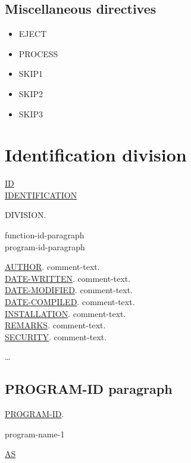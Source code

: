 \documentclass[a4paper,oneside,svgnames]{scrbook}
\makeatletter
\newcommand{\key}[1]{\underline{#1}}
\newcommand{\deleted}[1]{%
  \colorbox{red!75}{#1}}
\newcommand{\gnucobol}[1]{%
  \colorbox{orange!75}{#1}}
\newcommand{\miscext}[1]{%
  \colorbox{blue!50}{#1}}
\newcommand{\pending}[1]{%
  \textcolor{gray!75}{#1}}
\newenvironment{0-1}{$\left[ \begin{tabular}{@{}l@{}}}{\end{tabular} \right]$}
\newenvironment{0+}{$\left[\left| \begin{tabular}{@{}l@{}}}{\end{tabular} \right|\right]$}
\newenvironment{1=}{$\left\{ \begin{tabular}{@{}l@{}}}{\end{tabular} \right\}$}
\makeatother
\begin{document}
\section{Miscellaneous directives}

\begin{itemize}
\item \miscext{EJECT}
\item \miscext{\pending{PROCESS}}
\item \miscext{SKIP1}
\item \miscext{SKIP2}
\item \miscext{SKIP3}
\end{itemize}
\chapter{Identification division}

\begin{0-1}
  \begin{1=}
    \miscext{\key{ID}} \\
    \key{IDENTIFICATION}
  \end{1=}
  DIVISION.
\end{0-1}
\newline
\begin{1=}
  function-id-paragraph \\
  program-id-paragraph
\end{1=}
\newline
\deleted{
  \begin{0+}
    \key{AUTHOR}. comment-text. \\
    \key{DATE-WRITTEN}. comment-text. \\
    \key{DATE-MODIFIED}. comment-text. \\
    \key{DATE-COMPILED}. comment-text. \\
    \key{INSTALLATION}. comment-text. \\
    \key{REMARKS}. comment-text. \\
    \key{SECURITY}. comment-text. \\
  \end{0+} \gnucobol{\ldots}
}

\section{PROGRAM-ID paragraph}

\key{PROGRAM-ID}.
\begin{1=}
  program-name-1 \\
  \literal
\end{1=}
\begin{0-1} \key{AS} \literal \end{0-1}
\end{document}
